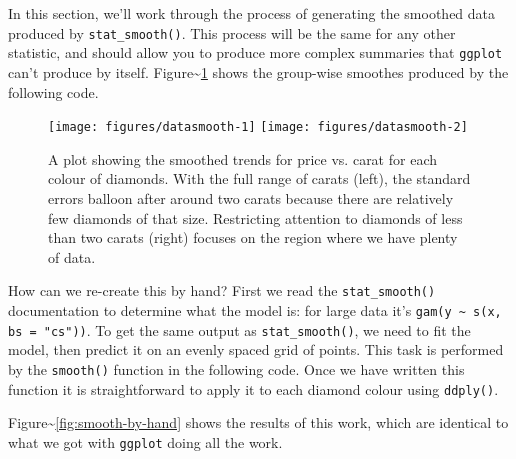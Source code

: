 In this section, we'll work through the process of generating the
smoothed data produced by \texttt{stat\_smooth()}. This process will be
the same for any other statistic, and should allow you to produce more
complex summaries that \texttt{ggplot} can't produce by itself.
Figure\textasciitilde{}\ref{fig:smooth} shows the group-wise smoothes
produced by the following code. 

\begin{Shaded}
\begin{Highlighting}[]
  \NormalTok{, }
   
\StringTok{ }\StringTok{ }\NormalTok{)}
  \NormalTok{, }
    \NormalTok{)}
\end{Highlighting}
\end{Shaded}

\begin{figure}
\texttt{[image: figures/datasmooth-1]} \texttt{[image: figures/datasmooth-2]} \caption{A plot showing the smoothed trends for price vs. carat for each colour of diamonds. With the full range of carats (left), the standard errors balloon after around two carats because there are relatively few diamonds of that size. Restricting attention to diamonds of less than two carats (right) focuses on the region where we have plenty of data.\label{fig:smooth}}
\end{figure}

How can we re-create this by hand? First we read the
\texttt{stat\_smooth()} documentation to determine what the model is:
for large data it's \texttt{gam(y \textasciitilde{} s(x, bs = "cs"))}.
To get the same output as \texttt{stat\_smooth()}, we need to fit the
model, then predict it on an evenly spaced grid of points. This task is
performed by the \texttt{smooth()} function in the following code. Once
we have written this function it is straightforward to apply it to each
diamond colour using \texttt{ddply()}. 

Figure\textasciitilde{}\ref{fig:smooth-by-hand} shows the results of
this work, which are identical to what we got with \texttt{ggplot} doing
all the work.


